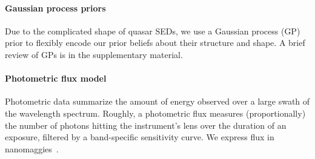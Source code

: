 \documentclass{article} %
\begin{document}
\paragraph{Gaussian process priors} 
\label{sec:gps}
Due to the complicated shape of quasar SEDs, we use a Gaussian process (GP) prior to flexibly encode our prior beliefs about their structure and shape.  A brief review of GPs is in the supplementary material.  
%

\paragraph{Photometric flux model }
Photometric data summarize the amount of energy observed over a large swath of the wavelength spectrum. 
Roughly, a photometric flux measures (proportionally) the number of photons hitting the instrument's lens over the duration of an exposure, filtered by a band-specific sensitivity curve. 
We express flux in nanomaggies~\cite{sdssnanomaggies}. 
\end{document}
